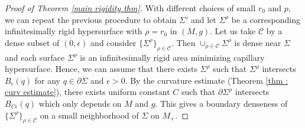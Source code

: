 \documentclass[11pt,letterpaper]{amsart}
\begin{document}
\begin{proof}[Proof of Theorem \ref{main rigidity thm}]
With different choices of small $r_{0}$ and $p$, we can repeat the previous procedure to obtain $\Sigma'$ and let $\Sigma^{\rho}$ be a corresponding infinitesimally rigid hypersurface with $\rho = r_{0}$ in $(M,g)$. Let us take $\mathcal{C}$ by a dense subset of $(0,\epsilon)$ and consider $\{ \Sigma^{\rho} \}_{\rho \in \mathcal{C}}$. Then $\cup_{\rho \in \mathcal{C}} \Sigma^{\rho}$ is dense near $\Sigma$ and each surface $\Sigma^{\rho}$ is an infinitesimally rigid area minimizing capillary hypersurface. Hence, we can assume that there exists $\Sigma^{\rho}$ such that $\Sigma^{\rho}$ intersects $B_{\epsilon}(q)$ for any $q \in \partial \Sigma$ and $\epsilon>0$. By the curvature estimate (Theorem \ref{thm : curv estimate}), there exists uniform constant $C$ such that $\partial \Sigma^{\rho}$ intersects $B_{C \epsilon}(q)$ which only depends on $M$ and $g$. This gives a boundary denseness of $\{ \Sigma^{\rho} \}_{\rho \in \mathcal{C}}$ on a small neighborhood of $\Sigma$ on $M_{+}$.


\end{proof}
\end{document}
